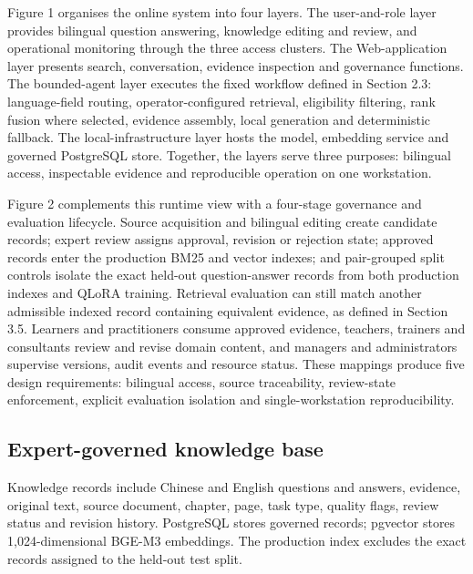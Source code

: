 Figure 1 organises the online system into four layers. The user-and-role layer provides bilingual question answering, knowledge editing and review, and operational monitoring through the three access clusters. The Web-application layer presents search, conversation, evidence inspection and governance functions. The bounded-agent layer executes the fixed workflow defined in Section 2.3: language-field routing, operator-configured retrieval, eligibility filtering, rank fusion where selected, evidence assembly, local generation and deterministic fallback. The local-infrastructure layer hosts the model, embedding service and governed PostgreSQL store. Together, the layers serve three purposes: bilingual access, inspectable evidence and reproducible operation on one workstation.

Figure 2 complements this runtime view with a four-stage governance and evaluation lifecycle. Source acquisition and bilingual editing create candidate records; expert review assigns approval, revision or rejection state; approved records enter the production BM25 and vector indexes; and pair-grouped split controls isolate the exact held-out question-answer records from both production indexes and QLoRA training. Retrieval evaluation can still match another admissible indexed record containing equivalent evidence, as defined in Section 3.5. Learners and practitioners consume approved evidence, teachers, trainers and consultants review and revise domain content, and managers and administrators supervise versions, audit events and resource status. These mappings produce five design requirements: bilingual access, source traceability, review-state enforcement, explicit evaluation isolation and single-workstation reproducibility.

\subsection{Expert-governed knowledge base}

Knowledge records include Chinese and English questions and answers, evidence, original text, source document, chapter, page, task type, quality flags, review status and revision history. PostgreSQL stores governed records; pgvector stores 1,024-dimensional BGE-M3 embeddings. The production index excludes the exact records assigned to the held-out test split.

